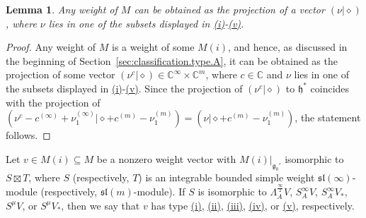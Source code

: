 \documentclass[12pt]{amsart}
\newcommand\C{\mathbb{C}}
\newcommand\g{\mathfrak{g}}
\newcommand\fh{\mathfrak{h}}
\newcommand\fsl{\mathfrak{sl}}
\theoremstyle{plain}
\newtheorem{lem}[theo]{Lemma}
\theoremstyle{definition}
\numberwithin{equation}{section}
\begin{document}
\begin{lem}\label{lem:reduction.to.sl.weights}
Any weight of $M$ can be obtained as the projection of a vector $(\nu | \diamond)$, where $\nu$ lies in one of the subsets displayed in {\rm \hyperref[list:types.of.weights.exterior]{(i)}-\hyperref[list:types.of.weights.schur.dual]{(v)}}.
\end{lem}
\begin{proof}
Any weight of $M$ is a weight of some $M(i)$, and hence, as discussed in the beginning of Section~\ref{sec:classification.type.A}, it can be obtained as the projection of some vector $(\nu^c | \diamond)\in \C^\infty\times \C^m$, where $c\in \C$ and $\nu$ lies in one of the subsets displayed in \hyperref[list:types.of.weights.exterior]{(i)}-\hyperref[list:types.of.weights.schur.dual]{(v)}. Since the projection of $( \nu^c | \diamond)$ to $\fh^*$ coincides with the projection of $(\nu^c - c^{(\infty)} + \nu_1^{(\infty)} | \diamond + c^{(m)} - \nu_1^{(m)}) = (\nu | \diamond + c^{(m)} - \nu_1^{(m)})$, the statement follows.
\end{proof}

Let $v\in M(i)\subseteq M$ be a nonzero weight vector with $M(i)|_{\g_0'}$ isomorphic to $S\boxtimes T$, where $S$ (respectively, $T$) is an integrable bounded simple weight $\fsl(\infty)$-module (respectively, $\fsl(m)$-module). If $S$ is isomorphic to $\Lambda_A^{\frac{\infty}{2}}V$, $S_A^\infty V$, $S_A^\infty V_*$, $S^\mu V$, or $S^\mu V_*$, then we say that $v$ has type \hyperref[list:types.of.weights.exterior]{(i)}, \hyperref[list:types.of.weights.symmetric]{(ii)}, \hyperref[list:types.of.weights.symmetric]{(iii)}, \hyperref[list:types.of.weights.schur]{(iv)}, or \hyperref[list:types.of.weights.schur.dual]{(v)}, respectively.
\end{document}
